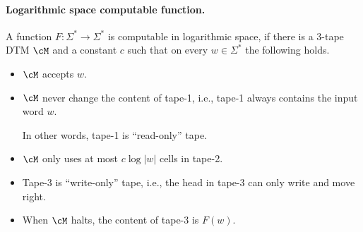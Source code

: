 \documentclass[11pt, a4paper]{article}
\begin{document}
\paragraph*{Logarithmic space computable function.}
A function $F:\Sigma^*\to\Sigma^*$ is computable in logarithmic space,
if there is a 3-tape DTM $\cM$ and a constant $c$
such that on every $w\in\Sigma^*$
the following holds.
\begin{itemize}
\item
$\cM$ accepts $w$.
\item 
$\cM$ never change the content of tape-1, i.e.,
tape-1 always contains the input word $w$.

In other words, tape-1 is ``read-only'' tape.
\item 
$\cM$ only uses at most $c \log |w|$ cells in tape-2.
\item 
Tape-3 is ``write-only'' tape, i.e., the head in tape-3 can only write and move right.
\item 
When $\cM$ halts, the content of tape-3 is $F(w)$.
\end{itemize}


 
\end{document}
